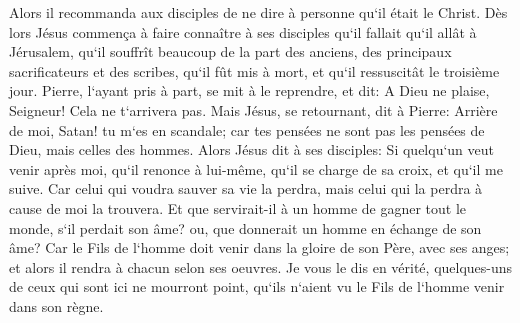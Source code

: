 \verse Alors il recommanda aux disciples de ne dire à personne qu`il était le Christ. 
\verse Dès lors Jésus commença à faire connaître à ses disciples qu`il fallait qu`il allât à Jérusalem, qu`il souffrît beaucoup de la part des anciens, des principaux sacrificateurs et des scribes, qu`il fût mis à mort, et qu`il ressuscitât le troisième jour. 
\verse Pierre, l`ayant pris à part, se mit à le reprendre, et dit: A Dieu ne plaise, Seigneur! Cela ne t`arrivera pas. 
\verse Mais Jésus, se retournant, dit à Pierre: Arrière de moi, Satan! tu m`es en scandale; car tes pensées ne sont pas les pensées de Dieu, mais celles des hommes. 
\verse Alors Jésus dit à ses disciples: Si quelqu`un veut venir après moi, qu`il renonce à lui-même, qu`il se charge de sa croix, et qu`il me suive. 
\verse Car celui qui voudra sauver sa vie la perdra, mais celui qui la perdra à cause de moi la trouvera. 
\verse Et que servirait-il à un homme de gagner tout le monde, s`il perdait son âme? ou, que donnerait un homme en échange de son âme? 
\verse Car le Fils de l`homme doit venir dans la gloire de son Père, avec ses anges; et alors il rendra à chacun selon ses oeuvres. 
\verse Je vous le dis en vérité, quelques-uns de ceux qui sont ici ne mourront point, qu`ils n`aient vu le Fils de l`homme venir dans son règne. 

